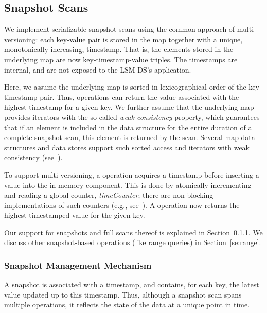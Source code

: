 \subsection{Snapshot Scans}
\label{Se:Snapshots}


We implement serializable snapshot scans using the common approach of multi-versioning: each key-value pair is  stored in the map together with a unique, monotonically increasing, timestamp. That is,
the elements stored in the underlying map are now key-timestamp-value triples.
The timestamps are internal, and are not exposed to the LSM-DS's application.

Here, we assume the underlying map is sorted in lexicographical order of the key-timestamp pair. Thus,  operations can return the value associated with the highest timestamp for a given key.
We further assume that the underlying map provides iterators with the
so-called \emph{weak consistency} property, which guarantees that if an element is included in the data structure for the entire duration of a complete snapshot  scan, this element is returned by the scan.
Several map data structures and data stores support such sorted access and iterators with weak consistency (see~\cite{ConcurrentSkipListMap,bronson2010practical}).

To support multi-versioning, a  operation acquires a timestamp before
inserting a value into the in-memory component.
This is done by atomically incrementing and reading a global counter, \emph{timeCounter};
there are non-blocking implementations of such counters (e.g., see~\cite{ConcurrencyInWindows2008}).
A  operation now returns the highest timestamped value for the given key.

Our support for snapshots and full scans thereof is explained in Section~\ref{se:snapshot-mechanism}.
We discuss other snapshot-based operations (like range queries) in Section~\ref{se:range}.

\subsubsection{Snapshot Management Mechanism}
\label{se:snapshot-mechanism}

A snapshot is associated with a timestamp, and contains, for each key, the
latest value updated up to this timestamp.
Thus, although a snapshot scan spans multiple operations, it
reflects the state of the data at a unique point in time.

